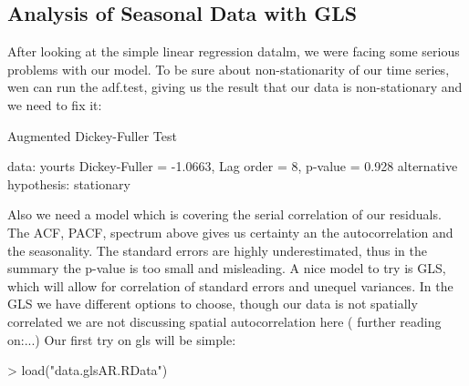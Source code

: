 \documentclass[11pt, a4paper]{article} %
\begin{document}
\subsection{Analysis of Seasonal Data with GLS}
After looking at the simple linear regression datalm, we were facing some serious problems with our model.
To be sure about non-stationarity of our time series, wen can run the adf.test, giving us the result that our data is non-stationary and we need to fix it:
\begin{Schunk}
\begin{Soutput}
	Augmented Dickey-Fuller Test

data:  yourts
Dickey-Fuller = -1.0663, Lag order = 8, p-value =
0.928
alternative hypothesis: stationary
\end{Soutput}
\end{Schunk}
Also we need a model which is covering the serial correlation of our residuals. The ACF, PACF, spectrum above gives us certainty an the autocorrelation and the seasonality.
The standard errors are highly underestimated, thus in the summary the p-value is too small and misleading.
A nice model to try is GLS, which will allow for correlation of standard errors and unequel variances.
In the GLS we have different options to choose, though our data is not spatially correlated we are not discussing spatial autocorrelation here ( further reading on:...)
Our first try on gls will be simple:

\begin{Schunk}
\begin{Sinput}
> load("data.glsAR.RData")
\end{Sinput}
\end{Schunk}
\end{document}
